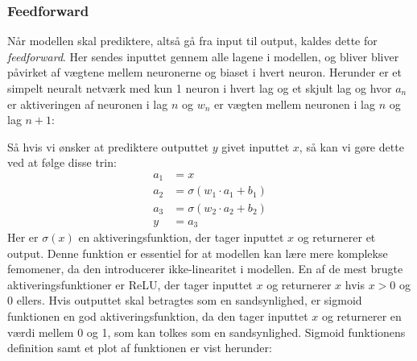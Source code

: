 \documentclass{article}
\begin{document}
\subsubsection{Feedforward}
Når modellen skal prediktere, altså gå fra input til output, kaldes dette for \textit{feedforward}. Her sendes inputtet gennem alle lagene i modellen, og bliver bliver påvirket af vægtene mellem neuronerne og biaset i hvert neuron. Herunder er et simpelt neuralt netværk med kun 1 neuron i hvert lag og et skjult lag og hvor $a_n$ er aktiveringen af neuronen i lag $n$ og $w_n$ er vægten mellem neuronen i lag $n$ og lag $n+1$:
\begin{center}
\label{fig:neural_network2}
\end{center}
Så hvis vi ønsker at prediktere outputtet $y$ givet inputtet $x$, så kan vi gøre dette ved at følge disse trin: \\
\begin{align}
a_1 &= x
\\
a_2 &= \sigma(w_1 \cdot a_1 + b_1)
\\
a_3 &= \sigma(w_2 \cdot a_2 + b_2)
\\
y &= a_3
\end{align}
Her er $\sigma(x)$ en aktiveringsfunktion, der tager inputtet $x$ og returnerer et output. Denne funktion er essentiel for at modellen kan lære mere komplekse femomener, da den introducerer ikke-linearitet i modellen. En af de mest brugte aktiveringsfunktioner er ReLU, der tager inputtet $x$ og returnerer $x$ hvis $x > 0$ og 0 ellers. \parencite{Sanderson_2017} Hvis outputtet skal betragtes som en sandsynlighed, er sigmoid funktionen en god aktiveringsfunktion, da den tager inputtet $x$ og returnerer en værdi mellem 0 og 1, som kan tolkes som en sandsynlighed. Sigmoid funktionens definition samt et plot af funktionen er vist herunder: \parencite{Nielsen_2019a}\\
\end{document}
